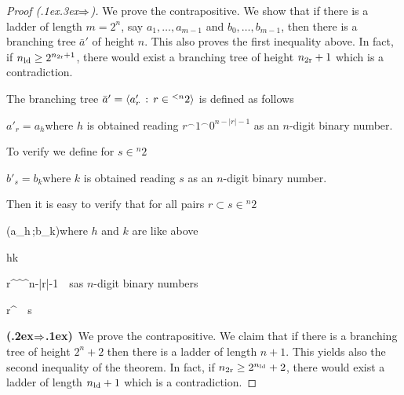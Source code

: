 \documentclass[scombinatorics.tex]{subfiles}
\begin{document}
\begin{proof}[Proof (\kern.1ex\kern.3ex\boldmath$\Rightarrow$)]





  
  We prove the contrapositive.
  We show that if there is a ladder of length $m=2^n$, say $a_1,\dots,a_{m-1}$ and $b_0,\dots,b_{m-1}$, then there is a branching tree $\bar a'$ of height $n$.
  This also proves the first inequality above.
  In fact, if $n_{\rm ld}\ge 2^{n_{\rm 2r}+1}$, there would exist a branching tree of height $n_{\rm 2r}+1$ which is a contradiction.
  
  The branching tree $\bar a'=\langle a'_r\, :\, r\in{}^{<n}2\rangle$ is defined as follows

  \quad $a'_r=a_h$\quad  where $h$ is obtained reading $r^\frown1^\frown0^{n-|r|-1}$ as an $n$-digit binary number.

  To verify  we define for $s\in{}^n2$ 
  
  \quad $b'_s=b_k$\quad  where $k$ is obtained reading $s$ as an $n$-digit binary number.

  Then it is easy to verify that for all pairs $r\subset s\in{}^n2$

  {\IFF}
  {\phi(a_h\,;b_k)}\hfill where $h$ and $k$ are like above

  \ceq{}
  {\IFF}
  {h\le k}

  \ceq{}
  {\IFF}
  {r^^^{n-|r|-1}\ \le\ s}\hfill  as $n$-digit binary numbers

  \ceq{}
  {\IFF}
  {r^\ \subseteq\ s}

  \textbf{(\kern.2ex\boldmath$\Rightarrow$\kern.1ex)}\ 
  We prove the contrapositive.
  We claim that if there is a branching tree of height $2^n+2$ then there is a ladder of length $n+1$.
  This yields also the second inequality of the theorem.
  In fact, if $n_{\rm 2r}\ge 2^{n_{\rm ld}}+2$, there would exist a ladder of length $n_{\rm ld}+1$ which is a contradiction.


\end{proof}
\end{document}
